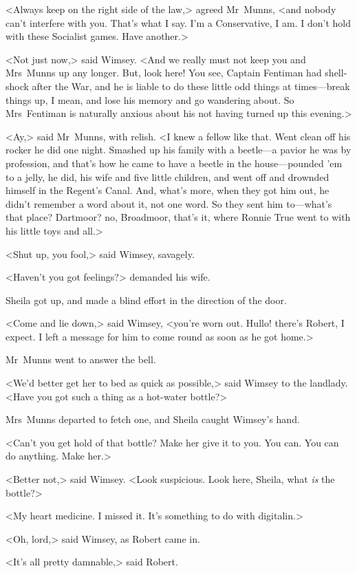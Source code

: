 <Always keep on the right side of the law,> agreed Mr~Munns, <and nobody can't interfere with you. That's what I say. I'm a Conservative, I am. I don't hold with these Socialist games. Have another.>

<Not just now,> said Wimsey. <And we really must not keep you and Mrs~Munns up any longer. But, look here! You see, Captain Fentiman had shell-shock after the War, and he is liable to do these little odd things at times—break things up, I mean, and lose his memory and go wandering about. So Mrs~Fentiman is naturally anxious about his not having turned up this evening.>

<Ay,> said Mr~Munns, with relish. <I knew a fellow like that. Went clean off his rocker he did one night. Smashed up his family with a beetle—a pavior he was by profession, and that's how he came to have a beetle in the house—pounded 'em to a jelly, he did, his wife and five little children, and went off and drownded himself in the Regent's Canal. And, what's more, when they got him out, he didn't remember a word about it, not one word. So they sent him to—what's that place? Dartmoor? no, Broadmoor, that's it, where Ronnie True went to with his little toys and all.>

<Shut up, you fool,> said Wimsey, savagely.

<Haven't you got feelings?> demanded his wife.

Sheila got up, and made a blind effort in the direction of the door.

<Come and lie down,> said Wimsey, <you're worn out. Hullo! there's Robert, I expect. I left a message for him to come round as soon as he got home.>

Mr~Munns went to answer the bell.

<We'd better get her to bed as quick as possible,> said Wimsey to the landlady. <Have you got such a thing as a hot-water bottle?>

Mrs~Munns departed to fetch one, and Sheila caught Wimsey's hand.

<Can't you get hold of that bottle? Make her give it to you. You can. You can do anything. Make her.>

<Better not,> said Wimsey. <Look suspicious. Look here, Sheila, what \emph{is} the bottle?>

<My heart medicine. I missed it. It's something to do with digitalin.>

<Oh, lord,> said Wimsey, as Robert came in.

<It's all pretty damnable,> said Robert.

